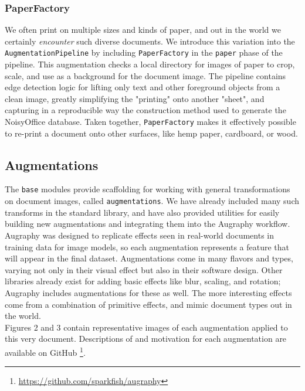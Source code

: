 \documentclass[runningheads]{llncs}
\begin{document}
\subsubsection{PaperFactory}
We often print on multiple sizes and kinds of paper, and out in the world we certainly \textit{encounter} such diverse documents. We introduce this variation into the \texttt{AugmentationPipeline} by including \texttt{PaperFactory} in the \texttt{paper} phase of the pipeline. This augmentation checks a local directory for images of paper to crop, scale, and use as a background for the document image. The pipeline contains edge detection logic for lifting only text and other foreground objects from a clean image, greatly simplifying the "printing" onto another "sheet", and capturing in a reproducible way the construction method used to generate the NoisyOffice database. Taken together, \texttt{PaperFactory} makes it effectively possible to re-print a document onto other surfaces, like hemp paper, cardboard, or wood.

\subsection{Augmentations}
The \texttt{base} modules provide scaffolding for working with general transformations on document images, called \texttt{augmentations}. We have already included many such transforms in the standard library, and have also provided utilities for easily building new augmentations and integrating them into the Augraphy workflow.\\

Augraphy was designed to replicate effects seen in real-world documents in training data for image models, so each augmentation represents a feature that will appear in the final dataset. Augmentations come in many flavors and types, varying not only in their visual effect but also in their software design. Other libraries already exist for adding basic effects like blur, scaling, and rotation; Augraphy includes augmentations for these as well. The more interesting effects come from a combination of primitive effects, and mimic document types out in the world.\\

Figures 2 and 3 contain representative images of each augmentation applied to this very document. Descriptions of and motivation for each augmentation are available on GitHub \footnote{\url{https://github.com/sparkfish/augraphy}}.
\end{document}
